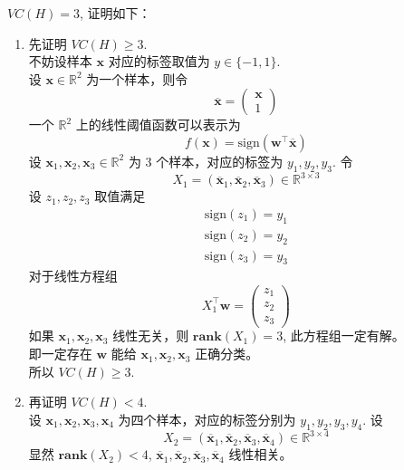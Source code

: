 \documentclass[11pt,letter,notitlepage]{article}
\newcommand{\rank}[1]{ \textbf{rank}  (#1)  }
\begin{document}
\begin{solution}
    $VC(H)=3$, 证明如下：
    \begin{enumerate}
        \item 先证明 $VC(H)\geq3$. \\
              不妨设样本 $\mathbf{x}$ 对应的标签取值为 $y\in\{-1,1\}$. \\
              设 $\mathbf{x}\in\mathbb{R}^2$ 为一个样本，则令
              $$\overline{\mathbf{x}}=\begin{pmatrix}
                      \mathbf{x} \\
                      1
                  \end{pmatrix}$$
              一个 $\mathbb{R}^2$ 上的线性阈值函数可以表示为
              $$f(\mathbf{x})=\text{sign} \left(\mathbf{w}^\top \overline{\mathbf{x}}\right)$$
              设 $\mathbf{x}_1, \mathbf{x}_2, \mathbf{x}_3 \in \mathbb{R}^2$ 为 3 个样本，对应的标签为 $y_1, y_2, y_3$. 令
              $$X_1=(\overline{\mathbf{x}}_1, \overline{\mathbf{x}}_2, \overline{\mathbf{x}}_3 )\in \mathbb{R}^{3\times 3}$$
              设 $z_1, z_2, z_3$ 取值满足
              $$\begin{aligned}
                      \text{sign}(z_1)=y_1 \\
                      \text{sign}(z_2)=y_2 \\
                      \text{sign}(z_3)=y_3
                  \end{aligned}$$
              对于线性方程组 $$X_1^\top \mathbf{w}=\begin{pmatrix}
                      z_1 \\z_2 \\z_3
                  \end{pmatrix}$$
              如果 $\mathbf{x}_1, \mathbf{x}_2, \mathbf{x}_3$ 线性无关，则 $\rank{X_1}=3$, 此方程组一定有解。\\
              即一定存在 $\mathbf{w}$ 能给 $\mathbf{x}_1, \mathbf{x}_2, \mathbf{x}_3$ 正确分类。\\
              所以 $VC(H)\geq3$.
        \item 再证明 $VC(H)<4$. \\
              设 $\mathbf{x}_1, \mathbf{x}_2, \mathbf{x}_3, \mathbf{x}_4$ 为四个样本，对应的标签分别为 $y_1, y_2, y_3, y_4$. 设
              $$X_2=(\overline{\mathbf{x}}_1, \overline{\mathbf{x}}_2, \overline{\mathbf{x}}_3, \overline{\mathbf{x}}_4) \in \mathbb{R}^{3\times 4}$$
              显然 $\rank{X_2}<4$, $\overline{\mathbf{x}}_1, \overline{\mathbf{x}}_2, \overline{\mathbf{x}}_3, \overline{\mathbf{x}}_4$ 线性相关。 \\

\end{enumerate}
\end{solution}
\end{document}

